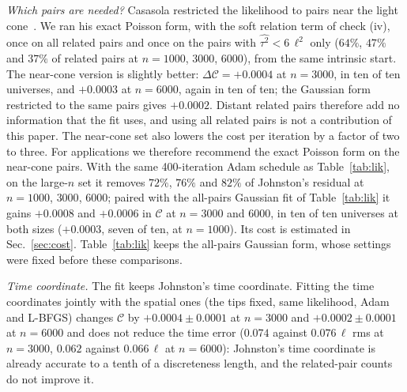 \documentclass[prd,twocolumn,superscriptaddress,nofootinbib,amsmath,amssymb,floatfix]{revtex4-2}
\begin{document}
\emph{Which pairs are needed?} Casasola restricted the likelihood to pairs near the light cone~\cite{Casasola26}. We ran his exact Poisson form, with the soft relation term of check (iv), once on all related pairs and once on the pairs with $\widehat{\tau^2}<6\,\ell^2$ only ($64\%$, $47\%$ and $37\%$ of related pairs at $n=1000$, $3000$, $6000$), from the same intrinsic start. The near-cone version is slightly better: $\Delta\mathcal C=+0.0004$ at $n=3000$, in ten of ten universes, and $+0.0003$ at $n=6000$, again in ten of ten; the Gaussian form restricted to the same pairs gives $+0.0002$. Distant related pairs therefore add no information that the fit uses, and using all related pairs is not a contribution of this paper. The near-cone set also lowers the cost per iteration by a factor of two to three. For applications we therefore recommend the exact Poisson form on the near-cone pairs. With the same 400-iteration Adam schedule as Table~\ref{tab:lik}, on the large-$n$ set it removes $72\%$, $76\%$ and $82\%$ of Johnston's residual at $n=1000$, $3000$, $6000$; paired with the all-pairs Gaussian fit of Table~\ref{tab:lik} it gains $+0.0008$ and $+0.0006$ in $\mathcal C$ at $n=3000$ and $6000$, in ten of ten universes at both sizes ($+0.0003$, seven of ten, at $n=1000$). Its cost is estimated in Sec.~\ref{sec:cost}. Table~\ref{tab:lik} keeps the all-pairs Gaussian form, whose settings were fixed before these comparisons.

\emph{Time coordinate.} The fit keeps Johnston's time coordinate. Fitting the time coordinates jointly with the spatial ones (the tips fixed, same likelihood, Adam and L-BFGS) changes $\mathcal C$ by $+0.0004\pm0.0001$ at $n=3000$ and $+0.0002\pm0.0001$ at $n=6000$ and does not reduce the time error ($0.074$ against $0.076\,\ell$ rms at $n=3000$, $0.062$ against $0.066\,\ell$ at $n=6000$): Johnston's time coordinate is already accurate to a tenth of a discreteness length, and the related-pair counts do not improve it.
\end{document}
